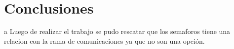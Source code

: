 \section{Conclusiones}a
Luego de realizar el trabajo se pudo rescatar que los semaforos tiene una relacion con la rama de comunicaciones ya que no son una opción.
\\